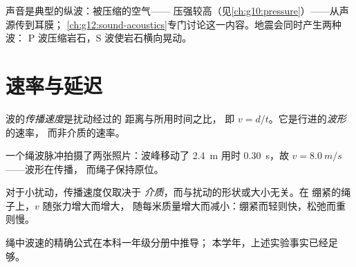 \begin{remark}[声音是纵波]\label{rem:g12:mechanical-waves:sound}
声音是典型的纵波：被压缩的空气——
压强较高（见\cref{ch:g10:pressure}）——从声源传到耳膜；
\cref{ch:g12:sound-acoustics}专门讨论这一内容。地震会同时产生两种波：
P 波压缩岩石，S 波使岩石横向晃动。
\end{remark}

\section{速率与延迟}

\begin{definition}[传播速度]\label{def:g12:mechanical-waves:speed}
波的\emph{传播速度}是扰动经过的
距离与所用时间之比，
即 $v = d/t$。它是行进的\emph{波形}的速率，
而非介质的速率。
\end{definition}

\begin{omfigure}

{\small 一个绳波脉冲拍摄了两张照片：波峰移动了 \qty{2.4}{m}
用时 \qty{0.30}{s}，故 $v = \qty{8.0}{m/s}$——波形在传播，
而绳子保持原位。}
\end{omfigure}

\begin{proposition}[介质决定速率]\label{prop:g12:mechanical-waves:medium}
对于小扰动，传播速度仅取决于
\emph{介质}，而与扰动的形状或大小无关。在
绷紧的绳子上，$v$ 随张力增大而增大，
随每米质量增大而减小：绷紧而轻则快，松弛而重则慢。\admitted
\end{proposition}

\begin{remark}[公式的出处]\label{rem:g12:mechanical-waves:ropeformula}
绳中波速的精确公式在本科一年级分册中推导；
本学年，上述实验事实已经足够。
\end{remark}


